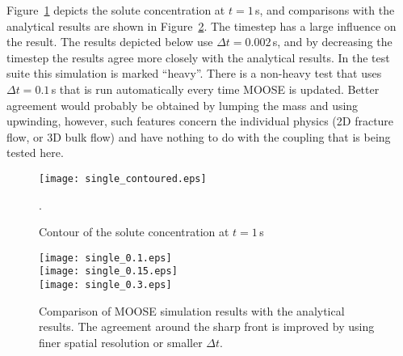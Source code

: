 \documentclass[]{scrreprt}
\begin{document}
Figure~\ref{single_contoured.fig} depicts the solute concentration at
$t=1$\,s, and comparisons with the analytical results are shown in
Figure~\ref{single_results.fig}.  The
timestep has a large influence on the result.  The results depicted
below use $\Delta t = 0.002$\,s, and by decreasing the timestep the
results agree more closely with the analytical results.  In the test
suite this simulation is marked ``heavy''.  There is a non-heavy test
that uses $\Delta t = 0.1$\,s that is run automatically every time
MOOSE is updated.  Better agreement would probably be obtained by
lumping the mass and using upwinding, however, such features concern
the individual physics (2D fracture flow, or 3D bulk flow) and have
nothing to do with the coupling that is being tested here.


\begin{figure}[htb]
\centering
\texttt{[image: single\_contoured.eps]}
\caption{Contour of the solute concentration at $t=1$\,s}.
\label{single_contoured.fig}
\end{figure}

\begin{figure}[p]
\centering
\texttt{[image: single\_0.1.eps]} \\
\texttt{[image: single\_0.15.eps]} \\
\texttt{[image: single\_0.3.eps]}
\caption{Comparison of MOOSE simulation results with the analytical
  results.  The agreement around the sharp front is improved by using
  finer spatial resolution or smaller $\Delta t$.}
\label{single_results.fig}
\end{figure}
\end{document}

